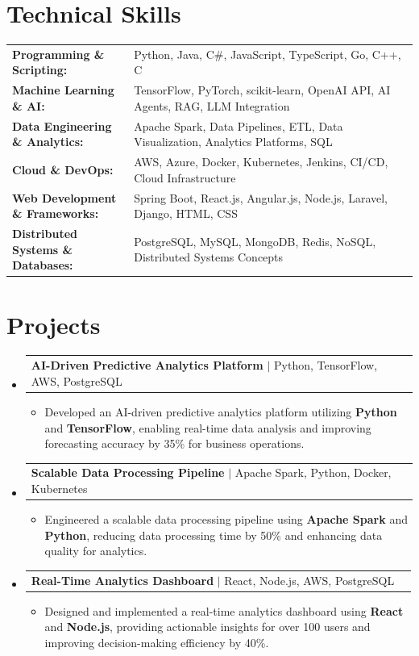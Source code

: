 \documentclass[letterpaper,10pt]{article}
\makeatletter
\newcommand{\resumeItem}[1]{
  \item{\fontsize{8pt}{9pt}\selectfont
    #1 \vspace{-3pt}
  }
}
\newcommand{\resumeProjectHeading}[2]{
    \item
    \begin{tabular*}{1.001\textwidth}{l@{\extracolsep{\fill}}r}
      \fontsize{8.5pt}{10pt}#1 & \textbf{\fontsize{8.5pt}{10pt} #2}\\
    \end{tabular*}\vspace{-7pt}
}
\newcommand{\resumeSubHeadingListStart}{\begin{itemize}[leftmargin=0pt, label={}]}
\newcommand{\resumeSubHeadingListEnd}{\end{itemize}}
\newcommand{\resumeItemListStart}{\begin{itemize}[leftmargin=*]}
\newcommand{\resumeItemListEnd}{\end{itemize}\vspace{-5pt}}
\makeatother
\begin{document}
\section{Technical Skills}
        \vspace{-14pt}
        \begin{table}[h]
            \fontsize{8pt}{9pt}\selectfont
            \begin{tabular}{p{0.3\linewidth} p{0.7\linewidth}}
                \textbf{Programming \& Scripting:} & Python, Java, C\#, JavaScript, TypeScript, Go, C++, C \\
                \textbf{Machine Learning \& AI:} & TensorFlow, PyTorch, scikit-learn, OpenAI API, AI Agents, RAG, LLM Integration \\
                \textbf{Data Engineering \& Analytics:} & Apache Spark, Data Pipelines, ETL, Data Visualization, Analytics Platforms, SQL \\
                \textbf{Cloud \& DevOps:} & AWS, Azure, Docker, Kubernetes, Jenkins, CI/CD, Cloud Infrastructure \\
                \textbf{Web Development \& Frameworks:} & Spring Boot, React.js, Angular.js, Node.js, Laravel, Django, HTML, CSS \\
                \textbf{Distributed Systems \& Databases:} & PostgreSQL, MySQL, MongoDB, Redis, NoSQL, Distributed Systems Concepts \\
            \end{tabular}
        \end{table}
 \vspace{-18pt}

\section{Projects}
    \vspace{-5pt}
    \resumeSubHeadingListStart
          \resumeProjectHeading
            {\textbf{AI-Driven Predictive Analytics Platform} $|$ Python, TensorFlow, AWS, PostgreSQL}{}
            \resumeItemListStart
                \resumeItem{Developed an AI-driven predictive analytics platform utilizing \textbf{Python} and \textbf{TensorFlow}, enabling real-time data analysis and improving forecasting accuracy by 35\% for business operations.}
            \resumeItemListEnd
        \vspace{-12pt}
    
        \resumeProjectHeading
            {\textbf{Scalable Data Processing Pipeline} $|$ Apache Spark, Python, Docker, Kubernetes}{}
        \resumeItemListStart
                \resumeItem{Engineered a scalable data processing pipeline using \textbf{Apache Spark} and \textbf{Python}, reducing data processing time by 50\% and enhancing data quality for analytics.}
        \resumeItemListEnd
      \vspace{-12pt}
      \resumeProjectHeading
        {\textbf{Real-Time Analytics Dashboard} $|$ React, Node.js, AWS, PostgreSQL}{}
    \resumeItemListStart
            \resumeItem{Designed and implemented a real-time analytics dashboard using \textbf{React} and \textbf{Node.js}, providing actionable insights for over 100 users and improving decision-making efficiency by 40\%.}
    \resumeItemListEnd
    \resumeSubHeadingListEnd
\end{document}
